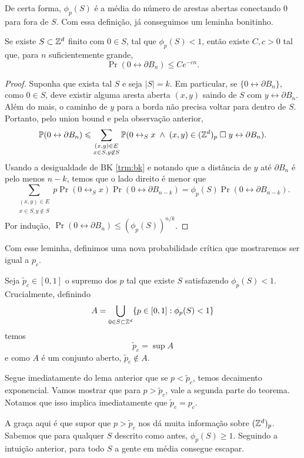 De certa forma, $\phi_p(S)$ é a média do número de arestas abertas
conectando $0$ para fora de $S$.
Com essa definição, já conseguimos um leminha bonitinho.
\begin{lemma}
	Se existe $S \subset \mathbb{Z}^d$ finito com $0 \in S$, tal que $\phi_p(S) < 1$,
	então existe $C,c > 0$ tal que, para $n$ suficientemente grande,
	\[
		\Pr(0 \leftrightarrow \partial B_n) \leq Ce^{-cn}.
	\]
\end{lemma}
\begin{proof}
	Suponha que exista tal $S$ e seja $|S| = k$. Em particular,
	se $\{0 \leftrightarrow \partial B_n\}$, como $0 \in S$, deve existir alguma
	aresta aberta $(x,y)$ saindo de $S$ com $y \leftrightarrow \partial B_n$.
	Além do mais, o caminho de $y$ para a borda não precisa voltar para dentro
	de $S$.
	Portanto, pelo union bound e pela observação anterior,
	\[
		\mathbb{P}(0 \leftrightarrow \partial B_n) \leqslant
		\sum_{\substack{(x,y) \in E\\x\in S, y\not \in S}} \mathbb{P}(0 \leftrightarrow_S x
		\; \land \; (x,y) \in (\mathbb{Z}^d)_p \; \square \; y \leftrightarrow \partial B_n).
	\]
	Usando a desigualdade de BK \ref{trm:bk} e notando que a
	distância de $y$ até
	$\partial B_n$ é pelo menos $n-k$, temos que o lado direito é menor que
	\[
		\sum_{\substack{(x,y) \in E\\x\in S, y\not \in S}} p\Pr(0 \leftrightarrow_S x)
		\Pr(0 \leftrightarrow \partial B_{n-k}) = \phi_p(S) \Pr(0
		\leftrightarrow \partial B_{n-k}).
	\]
	Por indução, $\Pr(0 \leftrightarrow \partial B_n) \leq (\phi_p(S))^{n/k}$.
\end{proof}

Com esse leminha, definimos uma nova probabilidade crítica que
mostraremos ser igual a $p_c$.
\begin{definition}
	Seja $\tilde{p}_c \in [0,1]$ o supremo dos $p$ tal que existe $S$
	satisfazendo $\phi_p(S) < 1$.
	Crucialmente, definindo
	\[
		A = \bigcup_{0 \in S \subset \mathbb{Z}^d} \{p \in [0,1] : \phi_p(S) < 1\}
	\]
	temos
	\[
		\tilde{p}_c = \sup A
	\]
	e como $A$ é um conjunto aberto, $\tilde{p}_c \not \in A$.

\end{definition}

Segue imediatamente do lema anterior que se $p < \tilde{p}_c$, temos
decaimento exponencial. Vamos mostrar que para $p > \tilde{p}_c$, vale
a segunda parte do teorema. Notamos que isso implica imediatamente
que $\tilde{p}_c = p_c$.

A graça aqui é que supor que $p > \tilde{p}_c$ nos dá muita
informação sobre $(\mathbb{Z}^d)_p$. Sabemos que para
qualquer $S$ descrito como antes, $\phi_p(S) \geq 1$. Seguindo a
intuição anterior, para
todo $S$ a gente em média consegue escapar.

